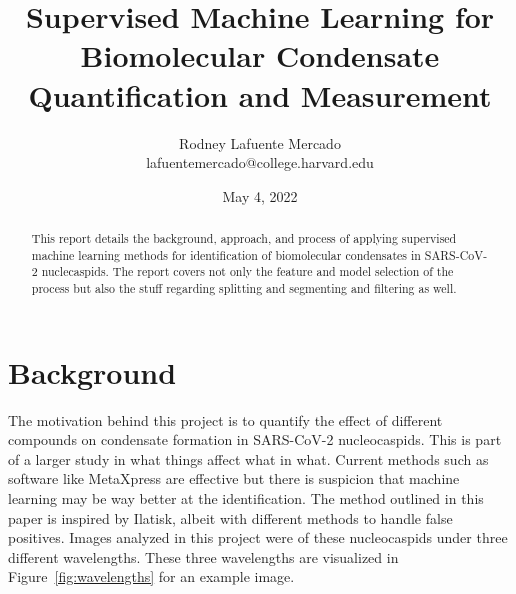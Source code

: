 \documentclass[11pt]{article}
\title{Supervised Machine Learning for Biomolecular Condensate Quantification and Measurement}
\author{Rodney Lafuente Mercado \\ lafuentemercado@college.harvard.edu}
\date{May 4, 2022}
\begin{document}
\maketitle{}

\begin{abstract}
\noindent This report details the background, approach, and process of applying supervised machine
learning methods for identification of biomolecular condensates in SARS-CoV-2 nuclecaspids. The
report covers not only the feature and model selection of the process but also the stuff regarding
splitting and segmenting and filtering as well.
\end{abstract}

\section{Background}

The motivation behind this project is to quantify the effect of different compounds on condensate
formation in SARS-CoV-2 nucleocaspids. This is part of a larger study in what things affect what in
what. Current methods such as software like MetaXpress are effective but there is suspicion that
machine learning may be way better at the identification. The method outlined in this paper is
inspired by Ilatisk, albeit with different methods to handle false positives. Images analyzed in
this project were of these nucleocaspids under three different wavelengths. These three wavelengths
are visualized in Figure~\ref{fig:wavelengths} for an example image.
\end{document}

